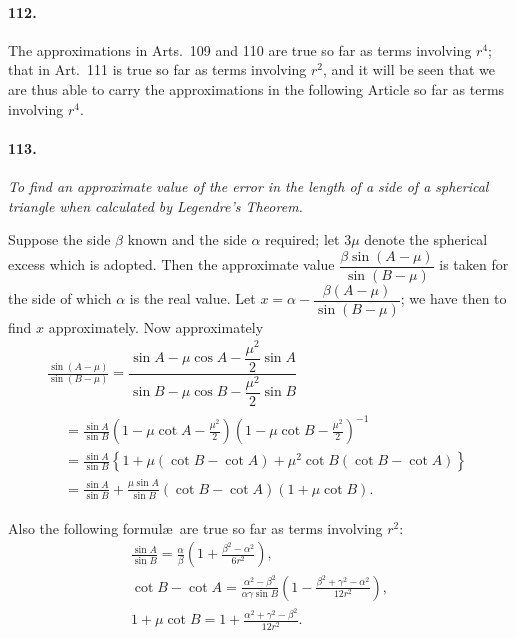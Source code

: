 \documentclass{book}[2004/02/16]
\begin{document}
\begin{mainmatter}
\begin{spacing}{1.3}
\paragraph{112.} The approximations in Arts.\ 109 and 110 are true so
far as terms involving $r^4$; that in Art.\ 111 is true so far as
terms involving $r^2$, and it will be seen that we are thus able
to carry the approximations in the following Article so far as
terms involving $r^4$.

\paragraph{113.} \textit{To find an approximate value of the error in the length
of a side of a spherical triangle when calculated by Legendre's
Theorem.}

Suppose the side $\beta$ known and the side $\alpha$ required; let $3\mu$ denote
the spherical excess which is adopted. Then the approximate
value $\dfrac{\beta\sin(A-\mu)}{\sin(B-\mu)}$ is taken for the side of which $\alpha$ is the real
value. Let $x=\alpha-\dfrac{\beta(A-\mu)}{\sin(B-\mu)}$; we have then to find $x$ approximately.
Now approximately
\begin{gather*}
\frac{\sin (A-\mu)}{\sin(B-\mu)}=\dfrac{\sin A-\mu\cos A-\dfrac{\mu^2}{2}\sin A}
{\sin B-\mu\cos B-\dfrac{\mu^2}{2}\sin B}\\[2ex]
\begin{aligned}
&=\frac{\sin A}{\sin B}\left(1-\mu\cot A-\frac{\mu^2}{2}\right)
\left(1-\mu\cot B-\frac{\mu^2}{2}\right)^{-1}\\
&=\frac{\sin A}{\sin B}\left\{1+\mu (\cot B-\cot A)+
\mu^2\cot B(\cot B-\cot A)\right\}\\
&=\frac{\sin A}{\sin B}+\frac{\mu\sin A}{\sin B}
(\cot B-\cot A)(1+\mu\cot B).
\end{aligned}
\end{gather*}

Also the following formul\ae\ are true so far as terms involving $r^2:$
\begin{gather*}
\frac{\sin A}{\sin B}=\frac{\alpha}{\beta}
\left(1+\frac{\beta^2-\alpha^2}{6r^2}\right),\\[2ex]
\cot B-\cot A=\frac{\alpha^2-\beta^2}{\alpha\gamma\sin B}
\left(1-\frac{\beta^2+\gamma^2-\alpha^2}{12r^2}\right),\\[2ex]
1+\mu\cot B=1+\frac{\alpha^2+\gamma^2-\beta^2}{12r^2}.
\end{gather*}


\end{spacing}
\end{mainmatter}
\end{document}
